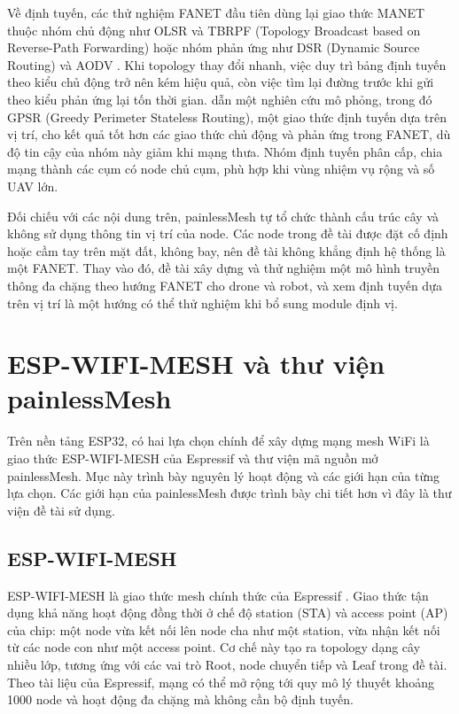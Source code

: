 Về định tuyến, các thử nghiệm FANET đầu tiên dùng lại giao thức MANET thuộc nhóm chủ động như OLSR và TBRPF (Topology Broadcast based on Reverse-Path Forwarding) hoặc nhóm phản ứng như DSR (Dynamic Source Routing) và AODV \citep{bekmezci2013}. Khi topology thay đổi nhanh, việc duy trì bảng định tuyến theo kiểu chủ động trở nên kém hiệu quả, còn việc tìm lại đường trước khi gửi theo kiểu phản ứng lại tốn thời gian. \citet{bekmezci2013} dẫn một nghiên cứu mô phỏng, trong đó GPSR (Greedy Perimeter Stateless Routing), một giao thức định tuyến dựa trên vị trí, cho kết quả tốt hơn các giao thức chủ động và phản ứng trong FANET, dù độ tin cậy của nhóm này giảm khi mạng thưa. Nhóm định tuyến phân cấp, chia mạng thành các cụm có node chủ cụm, phù hợp khi vùng nhiệm vụ rộng và số UAV lớn.

Đối chiếu với các nội dung trên, painlessMesh tự tổ chức thành cấu trúc cây và không sử dụng thông tin vị trí của node. Các node trong đề tài được đặt cố định hoặc cầm tay trên mặt đất, không bay, nên đề tài không khẳng định hệ thống là một FANET. Thay vào đó, đề tài xây dựng và thử nghiệm một mô hình truyền thông đa chặng theo hướng FANET cho drone và robot, và xem định tuyến dựa trên vị trí là một hướng có thể thử nghiệm khi bổ sung module định vị.


\section{ESP-WIFI-MESH và thư viện painlessMesh}\label{sec:2.3}

Trên nền tảng ESP32, có hai lựa chọn chính để xây dựng mạng mesh WiFi là giao thức ESP-WIFI-MESH của Espressif và thư viện mã nguồn mở painlessMesh. Mục này trình bày nguyên lý hoạt động và các giới hạn của từng lựa chọn. Các giới hạn của painlessMesh được trình bày chi tiết hơn vì đây là thư viện đề tài sử dụng.


\subsection{ESP-WIFI-MESH}

ESP-WIFI-MESH là giao thức mesh chính thức của Espressif \citep{espressif_mesh}. Giao thức tận dụng khả năng hoạt động đồng thời ở chế độ station (STA) và access point (AP) của chip: một node vừa kết nối lên node cha như một station, vừa nhận kết nối từ các node con như một access point. Cơ chế này tạo ra topology dạng cây nhiều lớp, tương ứng với các vai trò Root, node chuyển tiếp và Leaf trong đề tài. Theo tài liệu của Espressif, mạng có thể mở rộng tới quy mô lý thuyết khoảng 1000 node \citep{espressif_mesh_overview} và hoạt động đa chặng mà không cần bộ định tuyến.

